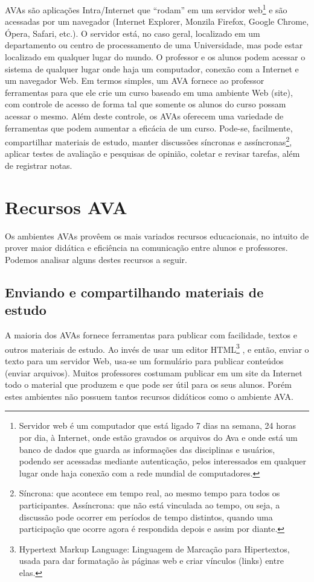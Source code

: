 AVAs são aplicações Intra/Internet que “rodam” em um servidor web\footnote{Servidor web é um computador que está ligado 7 dias na semana, 24 horas por dia, à Internet, onde estão gravados os arquivos do Ava e onde está um banco de dados que guarda as informações das disciplinas e usuários, podendo ser acessadas mediante autenticação, pelos interessados em qualquer lugar onde haja conexão com a rede mundial de computadores.}  e são acessadas por um navegador (Internet Explorer, Monzila Firefox, Google Chrome, Ópera, Safari, etc.). O servidor está, no caso geral, localizado em um departamento ou centro de processamento de uma Universidade, mas pode estar localizado em qualquer lugar do mundo. O professor e os alunos podem acessar o sistema de qualquer lugar onde haja um computador, conexão com a Internet e um navegador Web. Em termos simples, um AVA fornece ao professor ferramentas para que ele crie um curso baseado em uma ambiente Web (site), com controle de acesso de forma tal que somente os alunos do curso 
possam acessar o mesmo. Além deste controle, os AVAs oferecem uma variedade de ferramentas que podem aumentar a eficácia de um curso. Pode-se, facilmente, compartilhar materiais de estudo, manter discussões síncronas e assíncronas\footnote{Síncrona: que acontece em tempo real, ao mesmo tempo para todos os participantes. Assíncrona: que não está vinculada ao tempo, ou seja, a discussão pode ocorrer em períodos de tempo distintos, quando uma participação que ocorre agora é respondida depois e assim por diante.}, aplicar testes de avaliação e pesquisas de opinião, coletar e revisar tarefas, além de registrar notas. 


\section{Recursos AVA}
Os ambientes AVAs provêem os mais variados recursos educacionais, no intuito de prover maior didática e eficiência na comunicação entre alunos e professores.  Podemos analisar alguns destes recursos a seguir.

\subsection{Enviando e compartilhando materiais de estudo}
A maioria dos AVAs fornece ferramentas para publicar com facilidade, textos e outros materiais de estudo. Ao invés de usar um editor HTML\footnote{Hypertext Markup Language: Linguagem de Marcação para Hipertextos, usada para dar formatação às páginas web e criar vínculos (links) entre elas.} , e então, enviar o texto para um servidor Web, usa-se um formulário para publicar conteúdos (enviar arquivos). Muitos professores costumam publicar em um site da Internet todo o material que produzem e que pode ser útil para os seus alunos. Porém estes ambientes não possuem tantos recursos didáticos como o ambiente AVA.



